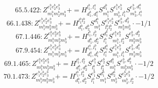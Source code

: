 \documentclass[letterpaper,10pt,fleqn,leqno,onecolumn]{article}
\begin{document}
\begin{equation} \;\;\;\;\;\;  65.5.422: Z^{e_{1}^{b}e_{2}^{b}e_{3}^{b}}_{m_{1}^{b}m_{2}^{b}m_{3}^{b}}+=H^{l_{1}^{b},l_{1}^{a}}_{d_{1}^{b},d_{1}^{a}}S^{d_{1}^{b}}_{m_{1}^{b}}S^{e_{1}^{b}e_{2}^{b}}_{m_{2}^{b},l_{1}^{b}}S^{e_{3}^{b},d_{1}^{a}}_{m_{3}^{b},l_{1}^{a}} \end{equation}
\begin{equation} \;\;\;\;\;\;  66.1.438: Z^{e_{1}^{b}e_{2}^{b}e_{3}^{b}}_{m_{1}^{b}m_{2}^{b}m_{3}^{b}}+=H^{l_{1}^{b}l_{2}^{b}}_{d_{1}^{b},d_{2}^{b}}S^{d_{1}^{b}}_{m_{1}^{b}}S^{e_{1}^{b}e_{2}^{b}}_{l_{1}^{b}l_{2}^{b}}S^{e_{3}^{b},d_{2}^{b}}_{m_{2}^{b}m_{3}^{b}}\cdot -1/1 \end{equation}
\begin{equation} \;\;\;\;\;\;  67.1.446: Z^{e_{1}^{b}e_{2}^{b}e_{3}^{b}}_{m_{1}^{b}m_{2}^{b}m_{3}^{b}}+=H^{l_{1}^{b},l_{2}^{b}}_{d_{1}^{b},d_{2}^{b}}S^{d_{1}^{b}}_{l_{1}^{b}}S^{e_{1}^{b}e_{2}^{b}}_{m_{1}^{b},l_{2}^{b}}S^{e_{3}^{b},d_{2}^{b}}_{m_{2}^{b}m_{3}^{b}} \end{equation}
\begin{equation} \;\;\;\;\;\;  67.9.454: Z^{e_{1}^{b}e_{2}^{b}e_{3}^{b}}_{m_{1}^{b}m_{2}^{b}m_{3}^{b}}+=H^{l_{1}^{a},l_{1}^{b}}_{d_{1}^{a},d_{1}^{b}}S^{d_{1}^{a}}_{l_{1}^{a}}S^{e_{1}^{b}e_{2}^{b}}_{m_{1}^{b},l_{1}^{b}}S^{e_{3}^{b},d_{1}^{b}}_{m_{2}^{b}m_{3}^{b}} \end{equation}
\begin{equation} \;\;\;\;\;\;  69.1.465: Z^{e_{1}^{b}e_{2}^{b}e_{3}^{b}}_{m_{1}^{b}m_{2}^{b}m_{3}^{b}}+=H^{l_{1}^{b},l_{2}^{b}}_{d_{1}^{b},d_{2}^{b}}S^{e_{1}^{b}}_{l_{1}^{b}}S^{e_{2}^{b}}_{l_{2}^{b}}S^{d_{1}^{b}}_{m_{1}^{b}}S^{e_{3}^{b},d_{2}^{b}}_{m_{2}^{b}m_{3}^{b}}\cdot -1/2 \end{equation}
\begin{equation} \;\;\;\;\;\;  70.1.473: Z^{e_{1}^{b}e_{2}^{b}e_{3}^{b}}_{m_{1}^{b}m_{2}^{b}m_{3}^{b}}+=H^{l_{1}^{b},l_{2}^{b}}_{d_{1}^{b},d_{2}^{b}}S^{e_{1}^{b}}_{l_{1}^{b}}S^{d_{1}^{b}}_{m_{1}^{b}}S^{d_{2}^{b}}_{m_{2}^{b}}S^{e_{2}^{b}e_{3}^{b}}_{m_{3}^{b},l_{2}^{b}}\cdot -1/2 \end{equation}
\end{document}

